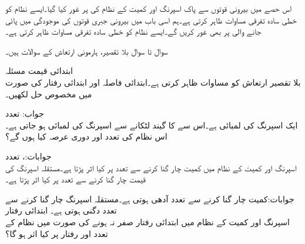 
اس حصے میں بیرونی قوتوں سے پاک  اسپرنگ اور کمیت کے نظام کی  پر غور کیا گیا۔ایسے نظام کو  خطی سادہ تفرقی مساوات ظاہر کرتی ہے۔ہم اسی باب میں بیرونی جبری قوتوں کی موجودگی میں پائی جانے والی  پر بھی غور کریں گے۔ایسے نظام کو  خطی سادہ تفرقی مساوات ظاہر کرتی ہے۔


سوال  تا سوال  بلا تقصیر، ہارمونی ارتعاش کے سوالات ہیں۔

 \quad ابتدائی قیمت مسئلہ\\
بلا تقصیر ارتعاش کو مساوات  ظاہر کرتی ہے۔ابتدائی فاصلہ  اور ابتدائی رفتار  کی صورت میں مخصوص حل لکھیں۔

جواب: 
\quad تعدد\\
ایک اسپرنگ کی لمبائی  ہے۔اس سے  کا گیند لٹکانے سے اسپرنگ کی لمبائی  ہو جاتی ہے۔اس نظام کی تعدد  اور دوری عرصہ  کیا ہوں گے؟ 

جوابات:، 
\quad تعدد\\
اسپرنگ اور کمیت کے نظام میں کمیت چار گنا کرنے سے تعدد پر کیا اثر پڑتا ہے۔مستقلہ اسپرنگ کی قیمت چار گنا کرنے سے تعدد پر کیا اثر پڑتا ہے۔

 جوابات:کمیت چار گنا کرنے سے تعدد آدھی ہوتی ہے۔مستقلہ اسپرنگ چار گنا کرنے سے تعدد دگنی ہوتی ہے۔ 
\quad ابتدائی رفتار\\
اسپرنگ اور کمیت کے نظام میں ابتدائی رفتار صفر نہ ہونے کی صورت میں نظام کے تعدد اور رفتار پر کیا اثر ہو گا؟

